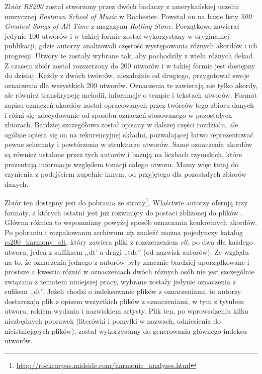 Zbiór \emph{RS200} \cite{de_clercq_corpus_2011} został stworzony przez dwóch badaczy z amerykańskiej uczelni muzycznej \emph{Eastman School of Music} w Rochester. Powstał on na bazie listy \emph{500 Greatest Songs of All Time} z magazynu \emph{Rolling Stone}. Początkowo zawierał jedynie 100 utworów i w takiej formie został wykorzystany w oryginalnej publikacji, gdzie autorzy analizowali częstość występowania różnych akordów i ich progresji. Utwory te zostały wybrane tak, aby pochodziły z wielu różnych dekad. Z czasem zbiór został rozszerzony do 200 utworów i w takiej formie jest dostępny do dzisiaj. Każdy z dwóch twórców, niezależnie od drugiego, przygotował swoje oznaczenia dla wszystkich 200 utworów. Oznaczenia te zawierają nie tylko akordy, ale również transkrypcję melodii, informacje o tempie i tekstach utworów. Format zapisu oznaczeń akordów został opracowanych przez twórców tego zbioru danych i różni się zdecydowanie od sposobu oznaczeń stosowanego w pozostałych zbiorach.  Bardziej szczegółowo został opisany w dalszej części rozdziału, ale ogólnie opiera się on na rekurencyjnej składni, pozwalającej łatwo reprezentować pewne schematy i powtórzenia w strukturze utworów. Same oznaczenia akordów są również ustalone przez tych autorów i bazują na liczbach rzymskich, które prezentują informacje względem tonacji całego utworu. Mamy więc tutaj do czynienia z podejściem zupełnie innym, od przyjętego dla pozostałych zbiorów danych.

Zbiór ten dostępny jest do pobrania ze strony\footnote{\url{http://rockcorpus.midside.com/harmonic_analyses.html}}. Właściwie autorzy oferują trzy formaty, z których ostatni jest już rozwinięty do postaci zbliżonej do plików . Główna różnica to wspomniany powyżej sposób oznaczania konkretnych akordów. Po pobraniu i rozpakowaniu archiwum \emph{zip} znaleźć można pojedynczy katalog \url{rs200_harmony_clt}, który zawiera pliki z rozszerzeniem \emph{clt}, po dwa dla każdego utworu, jeden z suffiksem ,,dt' a drugi ,,tdc'' (od nazwisk autorów). Ze względu na to, że oznaczenia jednego z autorów były znacznie bardziej uporządkowane i prostsze a kwestia różnić w oznaczeniach dwóch różnych osób nie jest szczególnie związana z tematem niniejszej pracy, wybrane zostały jedynie oznaczenia z sufikem ,,dt''. Jeżeli chodzi o indeksowanie plików z oznaczeniami, to autorzy dostarczają plik  z opisem wszystkich plików z oznaczeniami, w tym z tytułem utworu, rokiem wydania i nazwiskiem artysty. Plik ten, po wprowadzeniu kilku niezbędnych poprawek (literówki i pomyłki w nazwach, odniesienia do nieistniejących plików), został wykorzystany do generowania głównego indeksu utworów.

